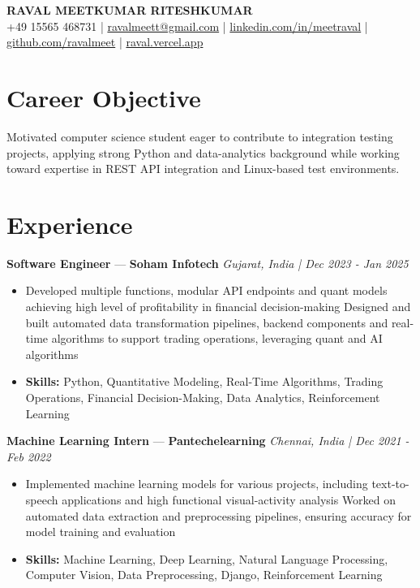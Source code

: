 \documentclass[a4paper,10pt]{article}
\begin{document}
\begin{center}
  {\Large\bfseries RAVAL MEETKUMAR RITESHKUMAR}\\[2pt]
  {\small +49 15565 468731 \;|\; \href{mailto:ravalmeett@gmail.com}{ravalmeett@gmail.com} \;|\; \href{https://www.linkedin.com/in/meetraval/}{linkedin.com/in/meetraval} \;|\; \href{https://github.com/ravalmeet}{github.com/ravalmeet} \;|\; \href{https://raval.vercel.app/}{raval.vercel.app}}
\end{center}
\vspace{-3pt}

\section*{Career Objective}
Motivated computer science student eager to contribute to integration testing projects, applying strong Python and data-analytics background while working toward expertise in REST API integration and Linux-based test environments.\par

\section*{Experience}
\textbf{Software Engineer} — \textbf{Soham Infotech} \hfill \textit{Gujarat, India \;|\; Dec 2023 - Jan 2025}\par
\vspace{1pt}
\begin{itemize}
  \item Developed multiple functions, modular API endpoints and quant models achieving high level of profitability in financial decision-making Designed and built automated data transformation pipelines, backend components and real-time algorithms to support trading operations, leveraging quant and AI algorithms
  \item \textbf{Skills:} Python, Quantitative Modeling, Real-Time Algorithms, Trading Operations, Financial Decision-Making, Data Analytics, Reinforcement Learning
\end{itemize}
\vspace{3pt}
\textbf{Machine Learning Intern} — \textbf{Pantechelearning} \hfill \textit{Chennai, India \;|\; Dec 2021 - Feb 2022}\par
\vspace{1pt}
\begin{itemize}
  \item Implemented machine learning models for various projects, including text-to-speech applications and high functional visual-activity analysis Worked on automated data extraction and preprocessing pipelines, ensuring accuracy for model training and evaluation
  \item \textbf{Skills:} Machine Learning, Deep Learning, Natural Language Processing, Computer Vision, Data Preprocessing, Django, Reinforcement Learning
\end{itemize}
\end{document}
